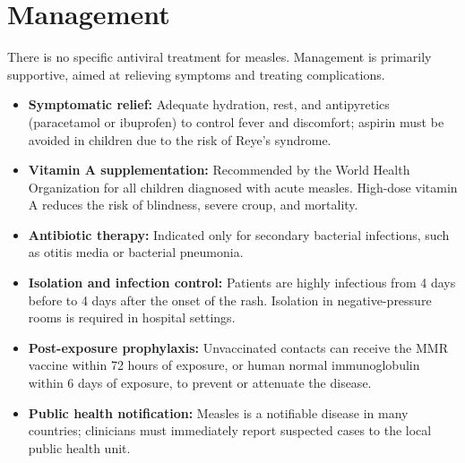 \section*{Management}
There is no specific antiviral treatment for measles. Management is primarily supportive, aimed at relieving symptoms and treating complications.
\begin{itemize}
    \item \textbf{Symptomatic relief:} Adequate hydration, rest, and antipyretics (paracetamol or ibuprofen) to control fever and discomfort; aspirin must be avoided in children due to the risk of Reye's syndrome.
    \item \textbf{Vitamin A supplementation:} Recommended by the World Health Organization for all children diagnosed with acute measles. High-dose vitamin A reduces the risk of blindness, severe croup, and mortality.
    \item \textbf{Antibiotic therapy:} Indicated only for secondary bacterial infections, such as otitis media or bacterial pneumonia.
    \item \textbf{Isolation and infection control:} Patients are highly infectious from 4 days before to 4 days after the onset of the rash. Isolation in negative-pressure rooms is required in hospital settings.
    \item \textbf{Post-exposure prophylaxis:} Unvaccinated contacts can receive the MMR vaccine within 72 hours of exposure, or human normal immunoglobulin within 6 days of exposure, to prevent or attenuate the disease.
    \item \textbf{Public health notification:} Measles is a notifiable disease in many countries; clinicians must immediately report suspected cases to the local public health unit.
\end{itemize}

